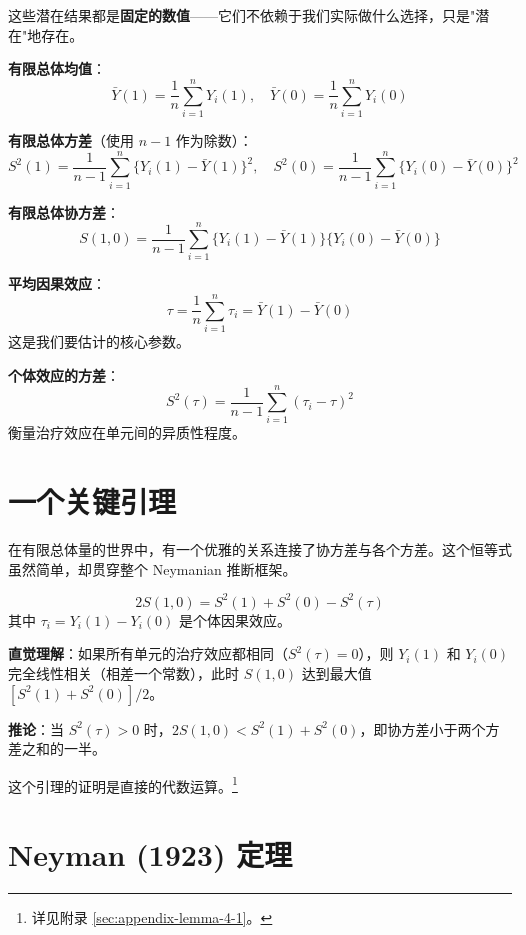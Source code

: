 这些潜在结果都是\textbf{固定的数值}——它们不依赖于我们实际做什么选择，只是"潜在"地存在。

\textbf{有限总体均值}：
\[
\bar{Y}(1) = \frac{1}{n}\sum_{i=1}^n Y_i(1), \quad
\bar{Y}(0) = \frac{1}{n}\sum_{i=1}^n Y_i(0)
\]

\textbf{有限总体方差}（使用 $n-1$ 作为除数）：
\[
S^2(1) = \frac{1}{n-1}\sum_{i=1}^n \{Y_i(1) - \bar{Y}(1)\}^2, \quad
S^2(0) = \frac{1}{n-1}\sum_{i=1}^n \{Y_i(0) - \bar{Y}(0)\}^2
\]

\textbf{有限总体协方差}：
\[
S(1,0) = \frac{1}{n-1}\sum_{i=1}^n \{Y_i(1) - \bar{Y}(1)\}\{Y_i(0) - \bar{Y}(0)\}
\]

\textbf{平均因果效应}：
\[
\tau = \frac{1}{n}\sum_{i=1}^n \tau_i = \bar{Y}(1) - \bar{Y}(0)
\]
这是我们要估计的核心参数。

\textbf{个体效应的方差}：
\[
S^2(\tau) = \frac{1}{n-1}\sum_{i=1}^n (\tau_i - \tau)^2
\]
衡量治疗效应在单元间的异质性程度。


\section{一个关键引理}\label{sec:4-3}

在有限总体量的世界中，有一个优雅的关系连接了协方差与各个方差。这个恒等式虽然简单，却贯穿整个 Neymanian 推断框架。

\begin{Lemma}\label{lemm:4.1}
\[
2S(1,0) = S^2(1) + S^2(0) - S^2(\tau)
\]
其中 $\tau_i = Y_i(1) - Y_i(0)$ 是个体因果效应。
\end{Lemma}

\textbf{直觉理解}：如果所有单元的治疗效应都相同（$S^2(\tau) = 0$），则 $Y_i(1)$ 和 $Y_i(0)$ 完全线性相关（相差一个常数），此时 $S(1,0)$ 达到最大值 $[S^2(1) + S^2(0)]/2$。

\textbf{推论}：当 $S^2(\tau) > 0$ 时，$2S(1,0) < S^2(1) + S^2(0)$，即协方差小于两个方差之和的一半。

这个引理的证明是直接的代数运算。\footnote{详见附录 \cref{sec:appendix-lemma-4-1}。}

\section{Neyman (1923) 定理}\label{sec:4-4}

